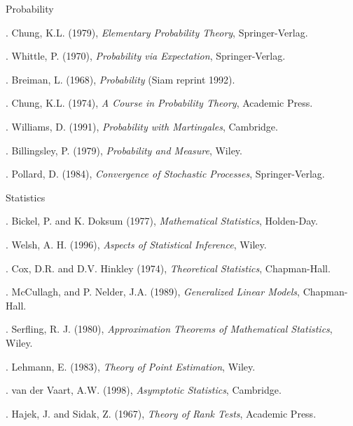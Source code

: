 \vspace{5mm}
\noindent
Probability

\vspace{3mm}
.   Chung, K.L. (1979), {\it Elementary Probability Theory}, Springer-Verlag.

.   Whittle, P. (1970), {\it Probability via Expectation}, Springer-Verlag.

.   Breiman, L. (1968), {\it Probability} (Siam reprint 1992).

.   Chung, K.L. (1974), {\it A Course in Probability Theory}, Academic Press.

.   Williams, D. (1991), {\it Probability with Martingales}, Cambridge.

.   Billingsley, P. (1979), {\it Probability and Measure}, Wiley.

.   Pollard, D. (1984), {\it Convergence of Stochastic Processes}, Springer-Verlag.

\vspace{3mm}
\noindent
Statistics

\vspace{3mm}
.  Bickel, P. and K. Doksum (1977), {\it Mathematical Statistics}, Holden-Day.

.  Welsh, A. H. (1996), {\it Aspects of Statistical Inference}, Wiley.

.   Cox, D.R. and D.V. Hinkley (1974), {\it Theoretical Statistics}, Chapman-Hall.

.   McCullagh,  and P. Nelder, J.A. (1989), {\it Generalized Linear Models}, Chapman-Hall.

.   Serfling, R. J. (1980), {\it Approximation Theorems of Mathematical 
Statistics}, Wiley.

.   Lehmann, E. (1983), {\it Theory of Point Estimation}, Wiley.

.   van der Vaart, A.W. (1998), {\em Asymptotic Statistics}, Cambridge.

.   Hajek, J. and Sidak, Z. (1967), {\it Theory of Rank Tests}, Academic Press.


